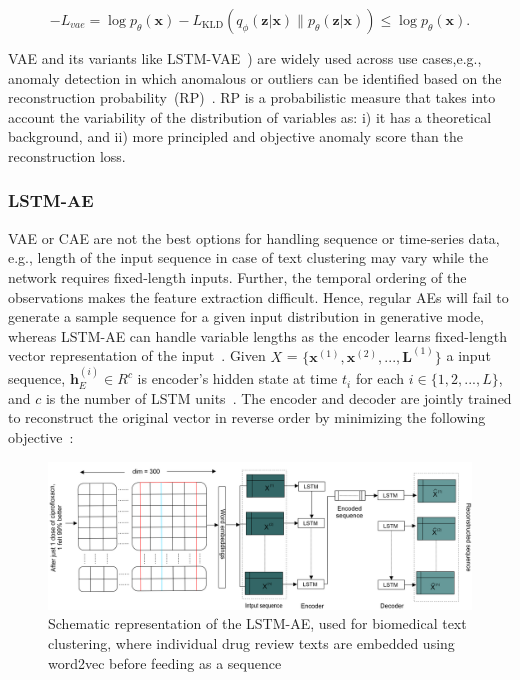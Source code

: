 \begin{equation}
    -L_{vae}=\log p_{\theta}(\mathbf{x})-L_{\mathrm{KLD}}\left(q_{\phi}(\mathbf{z}|\mathbf{x}) \| p_{\theta}(\mathbf{z}|\mathbf{x})\right) \leq \log p_{\theta}(\mathbf{x}). 
    \label{eq:lvae}
\end{equation}

\hspace*{3.5mm} VAE and its variants like LSTM-VAE~\cite{park2018multimodal}) are widely used across use cases,e.g., anomaly detection in which anomalous or outliers can be identified based on the reconstruction probability~(RP)~\cite{an2015variational}. RP is a probabilistic measure that takes into account the variability of the distribution of variables as: i) it has a theoretical background, and ii) more principled and objective anomaly score than the reconstruction loss. 

\subsubsection{LSTM-AE}
VAE or CAE are not the best options for handling sequence or time-series data, e.g., length of the input sequence in case of text clustering may vary while the network requires fixed-length inputs. Further, the temporal ordering of the observations makes the feature extraction difficult. Hence, regular AEs will fail to generate a sample sequence for a given input distribution in generative mode, whereas LSTM-AE can handle variable lengths as the encoder learns fixed-length vector representation of the input~\cite{KarimNCCA2019,karim2019drug}. Given $X$ = $\{\mathbf{x}^{(1)},\mathbf{x}^{(2)}, ..., \mathbf{L}^{(1)}\}$ a input sequence, $\mathbf{h}_E^{(i)} \in {R}^c$ is encoder's hidden state at time $t_i$ for each $i \in \{1,2,...,L\}$, and $c$ is the number of LSTM units~\cite{LSTM_Autoencoder}. The encoder and decoder are jointly trained to reconstruct the original vector in reverse order by minimizing the following objective~\cite{zhu2018hidden}:  

\begin{figure}[h]
	\centering
	\includegraphics[scale=0.5]{images/lstm_ae_v2.PNG}
    \caption{Schematic representation of the LSTM-AE, used for biomedical text clustering, where individual drug review texts are embedded using word2vec before feeding as a sequence~\cite{karimBIB2019}}	
	\label{fig:lstm_ae}
	\vspace{-2mm} 
\end{figure}

